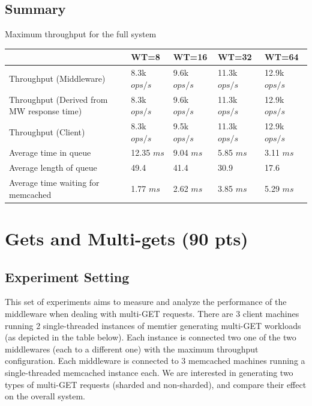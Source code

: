 \documentclass[11pt,a4paper]{article}
\begin{document}
\subsection{Summary}

\begin{center}
	{Maximum throughput for the full system}
	\begin{tabular}{|l|p{1.5cm}|p{1.5cm}|p{1.5cm}|p{1.5cm}|}
		\hline                                            & WT=8         & WT=16        & WT=32         & WT=64         \\ 
		\hline Throughput (Middleware)                    & 8.3k $ops/s$ & 9.6k $ops/s$ & 11.3k $ops/s$ & 12.9k $ops/s$ \\ 
		\hline Throughput (Derived from MW response time) & 8.3k $ops/s$ & 9.6k $ops/s$ & 11.3k $ops/s$ & 12.9k $ops/s$ \\ 
		\hline Throughput (Client)                        & 8.3k $ops/s$ & 9.5k $ops/s$ & 11.3k $ops/s$ & 12.9k $ops/s$ \\ 
		\hline Average time in queue                      & 12.35 $ms$   & 9.04 $ms$    & 5.85 $ms$     & 3.11 $ms$     \\ 
		\hline Average length of queue                    & 49.4         & 41.4         & 30.9          & 17.6          \\ 
		\hline Average time waiting for memcached         & 1.77 $ms$    & 2.62 $ms$    & 3.85 $ms$     & 5.29 $ms$     \\ 
		\hline 
	\end{tabular}
\end{center}

\section{Gets and Multi-gets (90 pts)}

\subsection{Experiment Setting}

This set of experiments aims to measure and analyze the performance of the middleware when dealing with multi-GET requests.
There are 3 client machines running 2 single-threaded instances of memtier generating multi-GET workloads (as depicted in the table below). Each instance is connected two one of the two middlewares (each to a different one) with the maximum throughput configuration.
Each middleware is connected to 3 memcached machines running a single-threaded memcached instance each.
We are interested in generating two types of multi-GET requests (sharded and non-sharded), and compare their effect on the overall system.
\end{document}
